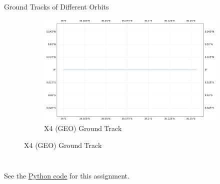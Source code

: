 \begin{hwkProblem}{3}{Ground Tracks of Different Orbits}
\begin{figure}[H]
\begin{center}
\begin{subfigure}{0.4\textwidth}
				\includegraphics[width=\linewidth]{./images/s03a4.png}
				\caption{X4 (GEO) Ground Track}
			\end{subfigure}
		\end{center}
	\end{figure}

	\hwkPart{} \label{hwk:s03b}

	\inputminted{python}{./code/s03b.txt}

	\hwkPart{} \label{hwk:s03c}

	\inputminted{python}{./code/s03c.txt}

	\hwkCode{} \label{code:s03}

	See the \href{https://www.github.com/vaisriv/enae441-hw02/blob/main/code/hw02.py}{Python code} for this assignment.

\end{hwkProblem}

